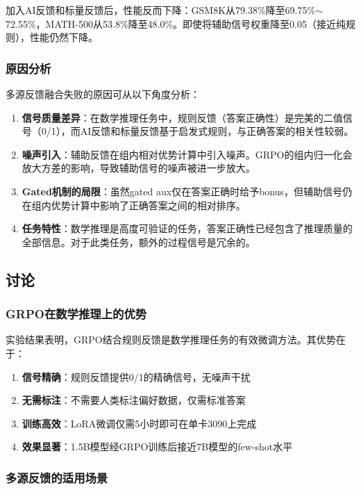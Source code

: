 \documentclass[10.5pt]{article}
\begin{document}
加入AI反馈和标量反馈后，性能反而下降：GSM8K从79.38\%降至69.75\%$\sim$72.55\%，MATH-500从53.8\%降至48.0\%。即使将辅助信号权重降至0.05（接近纯规则），性能仍然下降。

\subsubsection{原因分析}

多源反馈融合失败的原因可从以下角度分析：

\begin{enumerate}[leftmargin=2em]
  \item \textbf{信号质量差异}：在数学推理任务中，规则反馈（答案正确性）是完美的二值信号（0/1），而AI反馈和标量反馈基于启发式规则，与正确答案的相关性较弱。
  \item \textbf{噪声引入}：辅助反馈在组内相对优势计算中引入噪声。GRPO的组内归一化会放大方差的影响，导致辅助信号的噪声被进一步放大。
  \item \textbf{Gated机制的局限}：虽然gated aux仅在答案正确时给予bonus，但辅助信号仍在组内优势计算中影响了正确答案之间的相对排序。
  \item \textbf{任务特性}：数学推理是高度可验证的任务，答案正确性已经包含了推理质量的全部信息。对于此类任务，额外的过程信号是冗余的。
\end{enumerate}

\subsection{讨论}

\subsubsection{GRPO在数学推理上的优势}

实验结果表明，GRPO结合规则反馈是数学推理任务的有效微调方法。其优势在于：

\begin{enumerate}[leftmargin=2em]
  \item \textbf{信号精确}：规则反馈提供0/1的精确信号，无噪声干扰
  \item \textbf{无需标注}：不需要人类标注偏好数据，仅需标准答案
  \item \textbf{训练高效}：LoRA微调仅需5小时即可在单卡3090上完成
  \item \textbf{效果显著}：1.5B模型经GRPO训练后接近7B模型的few-shot水平
\end{enumerate}

\subsubsection{多源反馈的适用场景}
\end{document}
